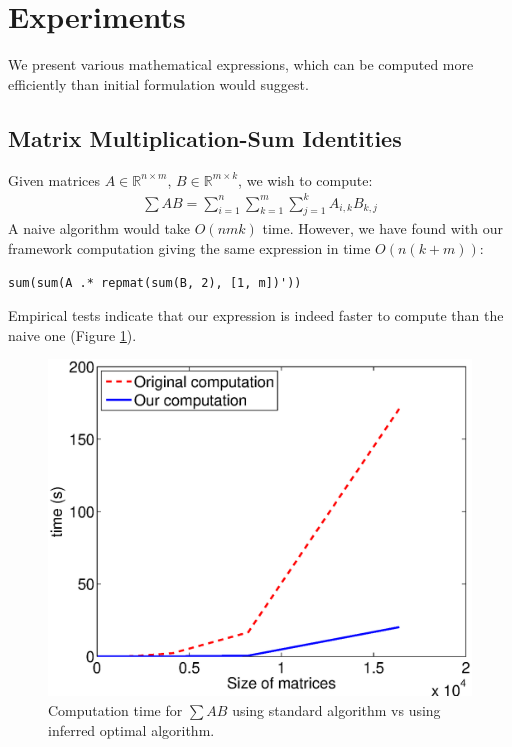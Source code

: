 \section{Experiments}

We present various mathematical expressions, which can be computed more efficiently
than initial formulation would suggest. 

\subsection{Matrix Multiplication-Sum Identities}

Given matrices $A \in \mathbb{R}^{n \times m}$, $B \in \mathbb{R}^{m
  \times k}$, we wish to compute:
\begin{gather*}
\sum AB = \sum_{i = 1}^n \sum_{k = 1}^m \sum_{j = 1}^k A_{i, k} B_{k, j} 
\end{gather*}
A naive algorithm would take $O(nmk)$ time. However, we have found with our framework 
computation giving the same expression in time $O(n(k + m))$:
\begin{lstlisting}
sum(sum(A .* repmat(sum(B, 2), [1, m])'))
\end{lstlisting}
Empirical tests indicate that our expression is indeed faster to
compute than the naive one (Figure \ref{ab}).

\begin{figure}[h]
\centering
\includegraphics[scale=0.3]{img/ab.eps}
\caption{Computation time for $\sum AB$ using standard algorithm vs using inferred optimal algorithm.}
\label{ab}
\end{figure}

